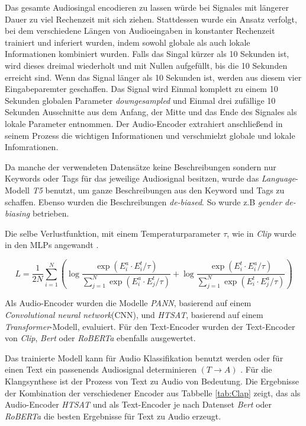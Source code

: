 \documentclass[
  a4paper,  %
  twoside,  %
  bibliography=totoc,
  headsepline,
  cleardoublepage=empty,
  parskip=half,
  draft=false
]{scrbook}
\begin{document}
Das gesamte Audiosingal encodieren zu lassen würde bei Signales mit längerer Dauer zu viel Rechenzeit mit sich ziehen. Stattdessen wurde ein Ansatz verfolgt, bei dem verschiedene Längen von Audioeingaben in konstanter Rechenzeit trainiert und inferiert wurden, indem sowohl globale als auch lokale Informationen kombiniert wurden. Falls das Singal kürzer als 10 Sekunden ist, wird dieses dreimal wiederholt und mit Nullen aufgefüllt, bis die 10 Sekunden erreicht sind. Wenn das Signal länger als 10 Sekunden ist, werden aus diesem vier Eingabeparemter geschaffen. Das Signal wird Einmal komplett zu einem 10 Sekunden globalen Parameter \emph{downgesampled} und Einmal drei zufällige 10 Sekunden Ausschnitte aus dem Anfang, der Mitte und das Ende des Signales als lokale Parameter entnommen. Der Audio-Encoder extrahiert anschließend in seinem Prozess die wichtigen Informationen und verschmielzt globale und lokale Infomrationen. 

Da manche der verwendeten Datensätze keine Beschreibungen sondern nur Keywords oder Tags für das jeweilige Audiosignal besitzen, wurde das \emph{Language}-Modell \emph{T5}\cite{raffel_exploring_2020} benutzt, um ganze Beschreibungen aus den Keyword und Tags zu schaffen. Ebenso wurden die Beschreibungen \emph{de-biased}. So wurde z.B \emph{gender de-biasing} betrieben. \cite{wu_large-scale_2023}

Die selbe Verlustfunktion, mit einem Temperaturparameter $\tau$, wie in \emph{Clip}\cite{radford_learning_2021} wurde in den MLPs angewandt \cite{wu_large-scale_2023}.

\begin{equation}
L=\frac{1}{2 N} \sum_{i=1}^N\left(\log \frac{\exp \left(E_i^a \cdot E_i^t / \tau\right)}{\sum_{j=1}^N \exp \left(E_i^a \cdot E_j^t / \tau\right)}+\log \frac{\exp \left(E_i^t \cdot E_i^a / \tau\right)}{\sum_{j=1}^N \exp \left(E_i^t \cdot E_j^a / \tau\right)}\right)
\end{equation}

Als Audio-Encoder wurden die Modelle \emph{PANN}\cite{kong_panns_2020}, basierend auf einem \emph{Convolutional neural network}(CNN), und \emph{HTSAT}\cite{chen_hts-at_2022}, basierend auf einem \emph{Transformer}-Modell, evaluiert. Für den Text-Encoder wurden der Text-Encoder von \emph{Clip}\cite{radford_learning_2021}, \emph{Bert}\cite{devlin_bert_2019} oder \emph{RoBERTa}\cite{liu_roberta_2019} ebenfalls ausgewertet. \cite{wu_large-scale_2023}


Das trainierte Modell kann für Audio Klassifikation benutzt werden oder für einen Text ein passenends Audiosignal determinieren $(T\rightarrow A)$ \cite{wu_large-scale_2023}. Für die Klangsynthese ist der Prozess von Text zu Audio von Bedeutung. Die Ergebnisse der Kombination der verschiedener Encoder aus Tabbelle \ref{tab:Clap} zeigt, das als Audio-Encoder \emph{HTSAT}\cite{chen_hts-at_2022} und als Text-Encoder je nach Datenset \emph{Bert}\cite{devlin_bert_2019} oder \emph{RoBERTa}\cite{liu_roberta_2019} die besten Ergebnisse für Text zu Audio erzeugt. 
\end{document}
